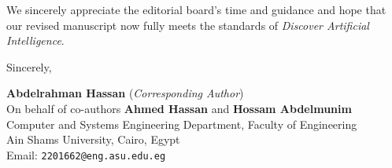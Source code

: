 \documentclass[10pt,a4paper]{article}
\begin{document}
\vspace{4pt}
\noindent We sincerely appreciate the editorial board's time and guidance and hope that our revised manuscript now fully meets the standards of \textit{Discover Artificial Intelligence}.

\vspace{6pt}
\noindent Sincerely,

\vspace{4pt}
\noindent\textbf{\color{navy}Abdelrahman Hassan} (\textit{Corresponding Author})\\
On behalf of co-authors \textbf{Ahmed Hassan} and \textbf{Hossam Abdelmunim}\\
Computer and Systems Engineering Department, Faculty of Engineering\\
Ain Shams University, Cairo, Egypt\\
Email: \texttt{2201662@eng.asu.edu.eg}
\end{document}
